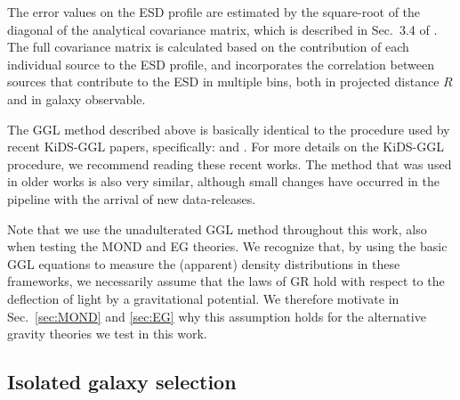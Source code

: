 \documentclass[usenatbib]{mnras}
\begin{document}
The error values on the ESD profile are estimated by the square-root of the diagonal of the analytical covariance matrix, which is described in Sec.~3.4 of \cite{viola2015}. The full covariance matrix is calculated based on the contribution of each individual source to the ESD profile, and incorporates the correlation between sources that contribute to the ESD in multiple bins, both in projected distance $R$ and in galaxy observable.

The GGL method described above is basically identical to the procedure used by recent KiDS-GGL papers, specifically: \cite{dvornik2017,dvornik2018} and \cite{brouwer2017,brouwer2018}. For more details on the KiDS-GGL procedure, we recommend reading these recent works. The method that was used in older works \cite[]{viola2015,sifon2015,uitert2016,brouwer2016} is also very similar, although small changes have occurred in the pipeline with the arrival of new data-releases.

Note that we use the unadulterated GGL method throughout this work, also when testing the MOND and EG theories. We recognize that, by using the basic GGL equations to measure the (apparent) density distributions in these frameworks, we necessarily assume that the laws of GR hold with respect to the deflection of light by a gravitational potential. We therefore motivate in Sec.~\ref{sec:MOND} and \ref{sec:EG} why this assumption holds for the alternative gravity theories we test in this work.


\subsection{Isolated galaxy selection}
\label{sec:isolation}
\end{document}
